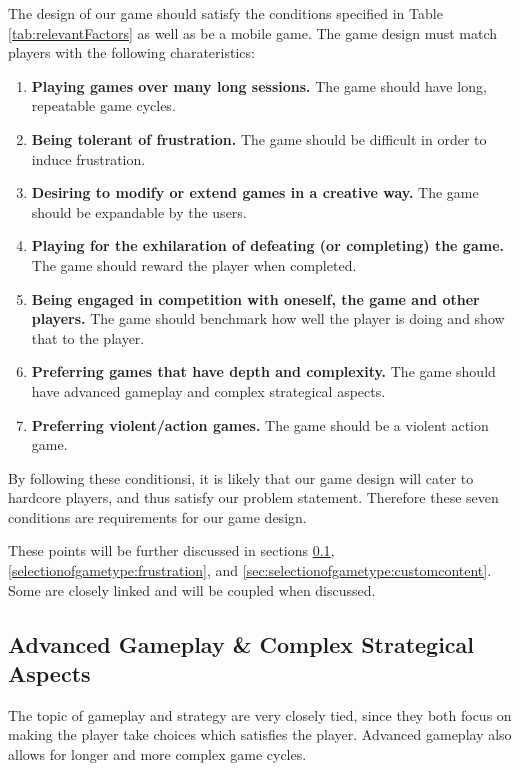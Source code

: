 The design of our game should satisfy the conditions specified in Table \ref{tab:relevantFactors} as well as be a mobile game.
The game design must match players with the following charateristics:
\begin{enumerate}\label{gamedesign:selectionofgametype:importantstuff}
\item \textbf{Playing games over many long sessions.} The game should have long, repeatable game cycles.
\item \textbf{Being tolerant of frustration.} The game should be difficult in order to induce frustration.
\item \textbf{Desiring to modify or extend games in a creative way.} The game should be expandable by the users.
\item \textbf{Playing for the exhilaration of defeating (or completing) the game.} The game should reward the player when completed.
\item \textbf{Being engaged in competition with oneself, the game and other players.} The game should benchmark how well the player is doing and show that to the player.
\item \textbf{Preferring games that have depth and complexity.} The game should have advanced gameplay and complex strategical aspects.
\item \textbf{Preferring violent/action games.} The game should be a violent action game.
\end{enumerate}
By following these conditionsi, it is likely that our game design will cater to hardcore players, and thus satisfy our problem statement. 
Therefore these seven conditions are requirements for our game design.

These points will be further discussed in sections \ref{selectionofgametype:advancedgameplay}, \ref{selectionofgametype:frustration}, and \ref{sec:selectionofgametype:customcontent}.
Some are closely linked and will be coupled when discussed.

\subsection{Advanced Gameplay \& Complex Strategical Aspects}\label{selectionofgametype:advancedgameplay}
The topic of gameplay and strategy are very closely tied, since they both focus on making the player take choices which satisfies the player.
Advanced gameplay also allows for longer and more complex game cycles.

